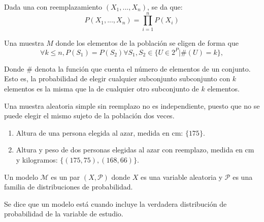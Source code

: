 \begin{corolario}
    Dada una \MAS con reemplazamiento $(X_1, ..., X_n)$, se da que:
    \[
        P(X_1, ..., X_n) = \prod_{i=1}^n P(X_i)
    \]
\end{corolario}

\begin{definicion}
    Una muestra $M$ donde los elementos de la población se eligen de forma que
    \[ \forall k \leq n, P(S_1) = P(S_2) \forall S_1, S_2 \in \{U \in 2^P | \#(U) = k \},  \]

    Donde $\#$ denota la función que cuenta el número de elementos de un conjunto.
    Esto es, la probabilidad de elegir cualquier subconjunto subconjunto con $k$ elementos es la misma
    que la de cualquier otro subconjunto de $k$ elementos.
\end{definicion}

\begin{corolario}
    Una muestra aleatoria simple sin reemplazo no es independiente, puesto que
    no se puede elegir el mismo sujeto de la población dos veces.
\end{corolario}

\begin{ejemplo}
    \begin{enumerate}
        \item Altura de una persona elegida al azar, medida en cm: $\{175\}$.
        \item Altura y peso de dos personas elegidas al azar con reemplazo, medida en cm y kilogramos:
              $\{(175, 75), (168, 66)\}$.
    \end{enumerate}
\end{ejemplo}

\begin{definicion}[Modelo]\cite[1.2]{mci}\cite[1.3.1]{targetedLearning}\label{def:modelo}
    Un modelo $\mathcal{M}$ es un par $(X, \mathcal{P})$ donde $X$ es una variable aleatoria
    y $\mathcal{P}$ es una familia de distribuciones de probabilidad.
\end{definicion}

\begin{nota} \label{nota:correctamenteEspecificado}
    Se dice que un modelo está  cuando incluye la verdadera distribución
    de probabilidad de la variable de estudio.
\end{nota}

